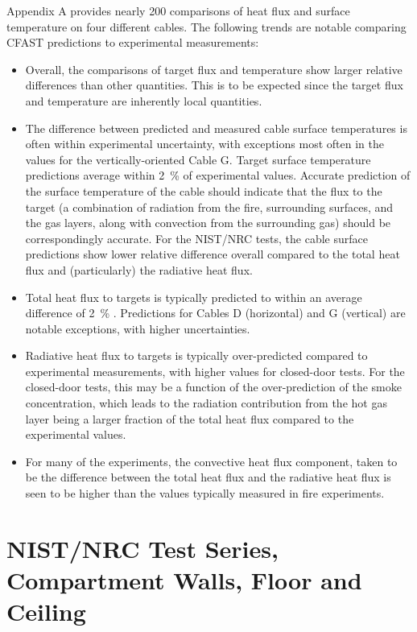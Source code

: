 Appendix A provides nearly 200 comparisons of heat flux and surface temperature on four different cables.  The following trends are notable comparing CFAST predictions to experimental measurements:
\begin{itemize}
\item Overall, the comparisons of target flux and temperature show larger relative differences than other quantities. This is to be expected since the target flux and temperature are inherently local quantities.
\item The difference between predicted and measured cable surface temperatures is often within experimental uncertainty, with exceptions most often in the values for the vertically-oriented Cable G.  Target surface temperature predictions average within 2~\% of experimental values.  Accurate prediction of the surface temperature of the cable should indicate that the flux to the target (a combination of radiation from the fire, surrounding surfaces, and the gas layers, along with convection from the surrounding gas) should be correspondingly accurate.  For the NIST/NRC tests, the cable surface predictions show lower relative difference overall compared to the total heat flux and (particularly) the radiative heat flux.
\item Total heat flux to targets is typically predicted to within an average difference of 2~\% .  Predictions for Cables D (horizontal) and G (vertical) are notable exceptions, with higher uncertainties.
\item Radiative heat flux to targets is typically over-predicted compared to experimental measurements, with higher values for closed-door tests.  For the closed-door tests, this may be a function of the over-prediction of the smoke concentration, which leads to the radiation contribution from the hot gas layer being a larger fraction of the total heat flux compared to the experimental values.
\item For many of the experiments, the convective heat flux component, taken to be the difference between the total heat flux and the radiative heat flux is seen to be higher than the values typically measured in fire experiments.
\end{itemize}


\section{NIST/NRC Test Series, Compartment Walls, Floor and Ceiling}

